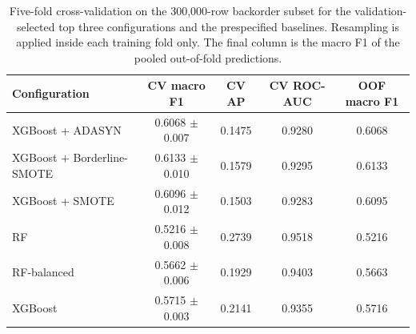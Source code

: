 \begin{table}[H]
\centering
\caption{Five-fold cross-validation on the 300{,}000-row backorder subset for the
validation-selected top three configurations and the prespecified baselines. Resampling
is applied inside each training fold only. The final column is the macro F1 of the
pooled out-of-fold predictions.}
\label{tab:bo-cv}
\small
\begin{tabular}{lcccc}
\toprule
Configuration & CV macro F1 & CV AP & CV ROC-AUC & OOF macro F1 \\
\midrule
XGBoost + ADASYN & 0.6068 $\pm$ 0.007 & 0.1475 & 0.9280 & 0.6068 \\
XGBoost + Borderline-SMOTE & 0.6133 $\pm$ 0.010 & 0.1579 & 0.9295 & 0.6133 \\
XGBoost + SMOTE & 0.6096 $\pm$ 0.012 & 0.1503 & 0.9283 & 0.6095 \\
RF & 0.5216 $\pm$ 0.008 & 0.2739 & 0.9518 & 0.5216 \\
RF-balanced & 0.5662 $\pm$ 0.006 & 0.1929 & 0.9403 & 0.5663 \\
XGBoost & 0.5715 $\pm$ 0.003 & 0.2141 & 0.9355 & 0.5716 \\
\bottomrule
\end{tabular}
\end{table}
